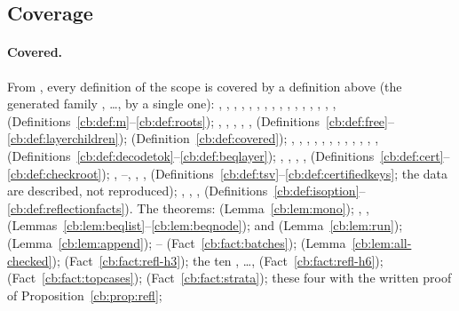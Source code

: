 \subsection{Coverage}\label{cb:sec:coverage}

\paragraph{Covered.} From , every definition of the scope is covered by a definition above
(the generated family , \dots,  by a single one):
, , , , , , ,
, , , , , , , ,
,  (Definitions~\ref{cb:def:m}--\ref{cb:def:roots}); , ,
, , , 
(Definitions~\ref{cb:def:free}--\ref{cb:def:layerchildren});  (Definition~\ref{cb:def:covered});
, , , , , ,
, , , , , , 
(Definitions~\ref{cb:def:decodetok}--\ref{cb:def:beqlayer}); , , , ,
 (Definitions~\ref{cb:def:cert}--\ref{cb:def:checkroot}); ,
--, , , 
(Definitions~\ref{cb:def:tsv}--\ref{cb:def:certifiedkeys}; the data are described, not reproduced); ,
, ,  (Definitions~\ref{cb:def:isoption}--%
\ref{cb:def:reflectionfacts}). The theorems:  (Lemma~\ref{cb:lem:mono}); ,
,  (Lemmas~\ref{cb:lem:beqlist}--\ref{cb:lem:beqnode});  and
 (Lemma~\ref{cb:lem:run});  (Lemma~\ref{cb:lem:append});
-- (Fact~\ref{cb:fact:batches});  (Lemma~\ref{cb:lem:all-checked});
 (Fact~\ref{cb:fact:refl-h3}); the ten , \dots,
 (Fact~\ref{cb:fact:refl-h6});  (Fact~\ref{cb:fact:topcases});
 (Fact~\ref{cb:fact:strata}); these four with the written proof of Proposition~\ref{cb:prop:refl};
